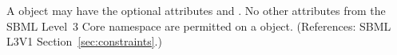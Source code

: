 A \Constraint object may have the optional attributes   and
.  No other attributes from the SBML Level~3 Core namespace
are permitted on a \Constraint object.  (References: SBML L3V1
Section~\ref{sec:constraints}.)
